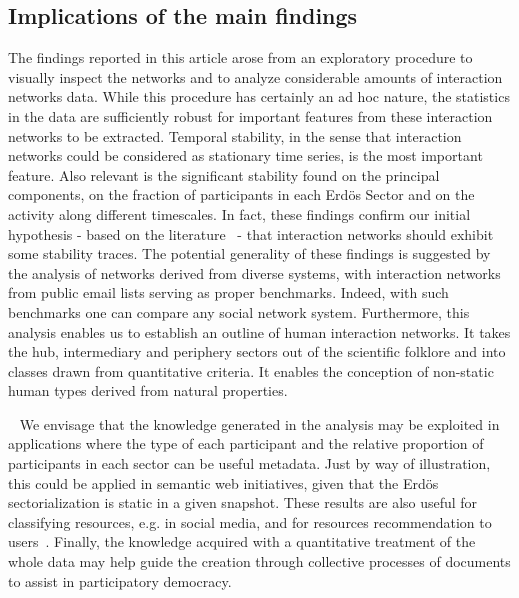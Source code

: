 \documentclass[%
aip,
jmp,%
amsmath,amssymb,
reprint,%
]{revtex4-1}
\begin{document}

\subsection{Implications of the main findings}\label{sec:impl}
The findings reported in this article arose from an exploratory procedure to visually inspect the networks and to analyze considerable amounts of interaction networks data.
While this procedure has certainly an ad hoc nature, the statistics in the data are sufficiently robust for important features from these interaction networks to be extracted.
Temporal stability, in the sense that interaction networks could be considered as stationary time series, is the most important feature. Also relevant is the significant stability found on the principal components, on the fraction of participants in each Erd\"os Sector and on the activity along different timescales. In fact, these findings confirm our initial hypothesis - based on the literature~\cite{newmanBook} - that interaction networks should exhibit some stability traces. The potential generality of these findings is suggested by the analysis of networks derived from diverse systems, with interaction networks from public email lists serving as proper benchmarks. Indeed, with such benchmarks one can compare any social network system. Furthermore, this analysis enables us to establish an outline of human interaction networks. It takes the hub, intermediary and periphery sectors out of the scientific folklore and into classes drawn from quantitative criteria. It enables the conception of non-static human types derived from natural properties.

 
We envisage that the knowledge generated in the analysis may be exploited in applications where the type of each participant and the relative proportion of participants in each sector can be useful metadata. Just by way of illustration, this could be applied in semantic web initiatives, given that the Erd\"os sectorialization is static in a given snapshot. These results are also useful for classifying resources, e.g. in social media, and for resources recommendation to users~\cite{opa}. 
Finally, the knowledge acquired with a quantitative treatment of the whole data may help guide the creation through collective processes of documents to assist in participatory democracy.
\end{document}

